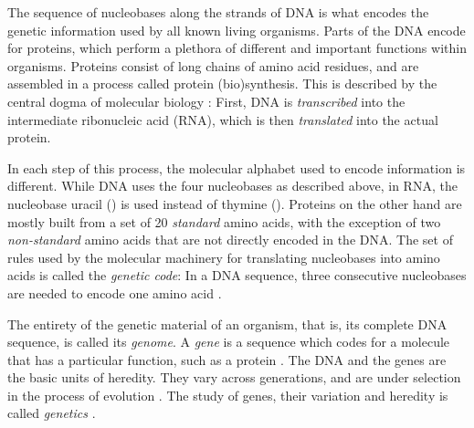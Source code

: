 
The sequence of nucleobases along the strands of DNA is what encodes the genetic information
used by all known living organisms.
Parts of the \ac{DNA} encode for proteins,
which perform a plethora of different and important functions within organisms.
Proteins consist of long chains of amino acid residues, and
are assembled in a process called protein (bio)synthesis.
This is described by the central dogma of molecular biology \cite{Crick1958,Crick1970}:
First, \ac{DNA} is \emph{transcribed} into the intermediate ribonucleic acid (RNA),
which is then \emph{translated} into the actual protein.

In each step of this process, the molecular alphabet used to encode information is different.
While \ac{DNA} uses the four nucleobases as described above,
in RNA, the nucleobase uracil () is used instead of thymine ().
Proteins on the other hand are mostly built from a set of \num{20} \emph{standard} amino acids,
with the exception of two \emph{non-standard} amino acids that are not directly encoded in the \ac{DNA}.
The set of rules used by the molecular machinery for translating nucleobases into amino acids
is called the \emph{genetic code}:
In a \ac{DNA} sequence, three consecutive nucleobases are needed to encode one amino acid \cite{Shu2017}.

The entirety of the genetic material of an organism, that is, its complete \ac{DNA} sequence, is called its \emph{genome}.
A \emph{gene} is a sequence which codes for a molecule that has a particular function, such as a protein \cite{Gericke2007}.
The \ac{DNA} and the genes are the basic units of heredity.
They vary across generations, and are under selection in the process of evolution \cite{Dawkins1989}.
The study of genes, their variation and heredity is called \emph{genetics} \cite{Griffiths2000}.


